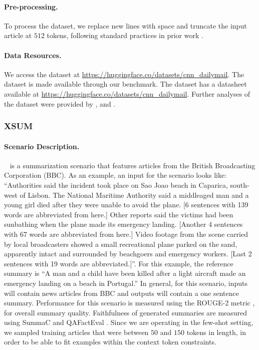 \paragraph{Pre-processing.}
To process the dataset, we replace new lines with space and truncate the input article at $512$ tokens, following standard practices in prior work \citep{zhang2020pegasus}.

\paragraph{Data Resources.}
We access the dataset at \url{https://huggingface.co/datasets/cnn_dailymail}.
The dataset is made available through our benchmark.
The dataset has a datasheet available at \url{https://huggingface.co/datasets/cnn_dailymail}.
Further analyses of the dataset were provided by \citet{jung2019earlier}, \citet{bommasani2020intrinsic} and \citet{tejaswin2021summarization}. 

\subsubsection{XSUM}
\paragraph{Scenario Description.}
\xsum~\citep{narayan-etal-2018-dont} is a summarization scenario that features articles from the British Broadcasting Corporation (BBC).
As an example, an input for the scenario looks like: ``Authorities said the incident took place on Sao Joao beach in Caparica, south-west
of Lisbon. The National Maritime Authority said a middleaged man and a young girl died after they were unable to avoid the plane. [6 sentences with 139 words are abbreviated from here.] Other reports said the victims had been sunbathing when the plane made its emergency landing. [Another 4 sentences with 67 words are abbreviated from here.] Video footage from the scene carried by local broadcasters showed a small recreational plane parked on the sand, apparently intact and surrounded by beachgoers and emergency workers.
[Last 2 sentences with 19 words are abbreviated.]''.
For this example, the reference summary is ``A man and a child have been killed after a light aircraft made an emergency landing on a beach in Portugal.''
In general, for this scenario, inputs will contain news articles from BBC and outputs will contain a one sentence summary.
Performance for this scenario is measured using the ROUGE-2 metric \citep{lin-2004-rouge}, for overall summary quality. Faithfulness of generated summaries are measured using SummaC \citep{10.1162/tacl_a_00453} and QAFactEval \citep{fabbri-etal-2022-qafacteval}. 
Since we are operating in the few-shot setting, we sampled training articles that were between $50$ and $150$ tokens in length, in order to be able to fit examples within the context token constraints.

